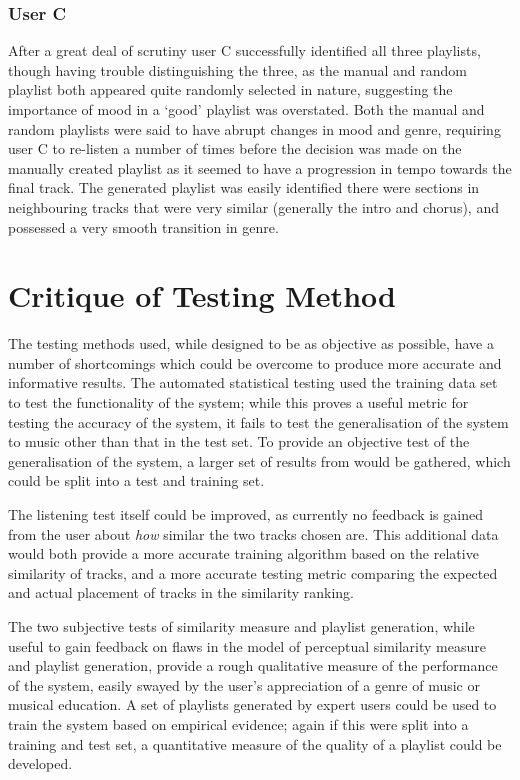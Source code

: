 \subsubsection{User C}
\label{text:testing:user:blind:c}
After a great deal of scrutiny user C successfully identified all three playlists, though having trouble distinguishing the three, as the manual and random playlist both appeared quite randomly selected in nature, suggesting the importance of mood in a `good' playlist was overstated. Both the manual and random playlists were said to have abrupt changes in mood and genre, requiring user C to re-listen a number of times before the decision was made on the manually created playlist as it seemed to have a progression in tempo towards the final track. The generated playlist was easily identified there were sections in neighbouring tracks that were very similar (generally the intro and chorus), and possessed a very smooth transition in genre.
\section{Critique of Testing Method}
The testing methods used, while designed to be as objective as possible, have a number of shortcomings which could be overcome to produce more accurate and informative results. The automated statistical testing used the training data set to test the functionality of the system; while this proves a useful metric for testing the accuracy of the system, it fails to test the generalisation of the system to music other than that in the test set. To provide an objective test of the generalisation of the system, a larger set of results from  would be gathered, which could be split into a test and training set.

The listening test itself could be improved, as currently no feedback is gained from the user about \emph{how} similar the two tracks chosen are. This additional data would both provide a more accurate training algorithm based on the relative similarity of tracks, and a more accurate testing metric comparing the expected and actual placement of tracks in the similarity ranking.

The two subjective tests of similarity measure and playlist generation, while useful to gain feedback on flaws in the model of perceptual similarity measure and playlist generation, provide a rough qualitative measure of the performance of the system, easily swayed by the user's appreciation of a genre of music or musical education. A set of playlists generated by expert users could be used to train the system based on empirical evidence; again if this were split into a training and test set, a quantitative measure of the quality of a playlist could be developed.
